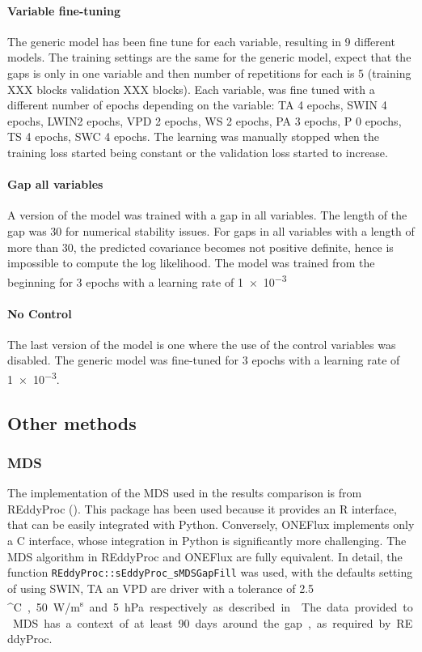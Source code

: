 \documentclass{article}
\let\Oldsubsection\subsection
\renewcommand{\subsection}{\FloatBarrier\Oldsubsection}
\begin{document}
\paragraph{Variable fine-tuning} The generic model has been fine tune for each variable, resulting in \num{9} different models. The training settings are the same for the generic model, expect that the gaps is only in one variable and then number of repetitions for each is 5 (training XXX blocks validation XXX blocks). Each variable, was fine tuned with a different number of epochs depending on the variable: TA \num{4} epochs, SW\textunderscore IN \num{4} epochs, LW\textunderscore IN\num{2} epochs, VPD \num{2} epochs, WS \num{2} epochs, PA \num{3} epochs, P \num{0} epochs, TS \num{4} epochs, SWC \num{4} epochs. The learning was manually stopped when the training loss started being constant or the validation loss started to increase.

\paragraph{Gap all variables} A version of the model was trained with a gap in all variables. The length of the gap was \num{30} for numerical stability issues. For gaps in all variables with a length of more than 30, the predicted covariance becomes not positive definite, hence is impossible to compute the log likelihood. The model was trained from the beginning for \num{3} epochs with a learning rate of \num{1e-3}

\paragraph{No Control} The last version of the model is one where the use of the control variables was disabled. The generic model was fine-tuned for \num{3} epochs with a learning rate of \num{1e-3}.

\subsection{Other methods}

\subsubsection{MDS}

The implementation of the MDS used in the results comparison is from REddyProc (\cite{wutzler_basic_2018}). This package has been used because it provides an R interface, that can be easily integrated with Python. Conversely, ONEFlux implements only a C interface, whose integration in Python is significantly more challenging.  The MDS algorithm in REddyProc and ONEFlux are fully equivalent. In detail, the function \verb|REddyProc::sEddyProc_sMDSGapFill| was used, with the defaults setting of using SW\textunderscore IN, TA an VPD are driver with a tolerance of 2.5 \si{^\circ C}, 50 \si{W/m^s} and 5 \si{hPa} respectively as described in \cite{reichstein_separation_2005}.
The data provided to MDS has a context of at least 90 days around the gap, as required by REddyProc. 
\end{document}
